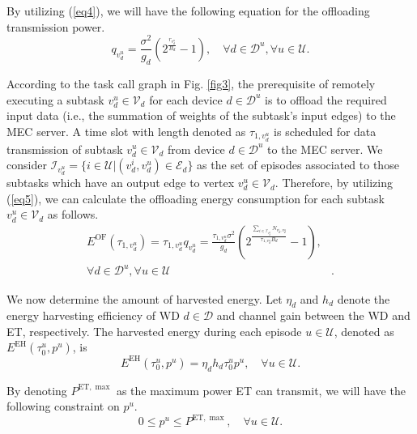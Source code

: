 \documentclass[12pt,draftclsnofoot,onecolumn]{IEEEtran}
\begin{document}
By utilizing (\ref{eq4}), we will have the following equation for the offloading transmission power.
\begin{equation}\label{eq5}
	q_{v_d^u} = \frac{\sigma^2}{g_d}\left(2^{\frac{r_{v_d^u}}{B_d}}-1\right),\quad\forall d\in\mathcal{D}^u, \forall u\in\mathcal{U}.
\end{equation}

According to the task call graph in Fig. \ref{fig3}, the prerequisite of remotely executing a subtask $v_d^u\in\mathcal{V}_d$ for each device $d\in\mathcal{D}^u$ is to offload the required input data (i.e., the summation of weights of the subtask's input edges) to the MEC server. A time slot with length denoted as $\tau_{1,v_d^u}$ is scheduled for data transmission of subtask $v_d^u\in\mathcal{V}_d$ from device $d\in\mathcal{D}^u$ to the MEC server. We consider $\mathcal{I}_{v_d^u}=\{i\in\mathcal{U}|(v_d^i,v_d^u)\in\mathcal{E}_d\}$ as the set of episodes associated to those subtasks which have an output edge to vertex $v_d^u\in\mathcal{V}_d$. Therefore, by utilizing (\ref{eq5}), we can calculate the offloading energy consumption for each subtask $v_d^u\in\mathcal{V}_d$ as follows.
\begin{equation}\label{eq6}
	\begin{aligned}
		E^{\text{OF}}(\tau_{1,v_d^u}) = \tau_{1,v_d^u}q_{v_d^u} = \frac{\tau_{1,v_d^u}\sigma^2}{g_d}\left(2^{\frac{\sum_{i\in\mathcal{I}_{v_d^u}}{N_{v_d^i,v_d^u}}}{\tau_{1,v_d^u}B_d}}-1\right),&\\
		\forall d\in\mathcal{D}^u, \forall u\in\mathcal{U} &.
	\end{aligned}
\end{equation}

We now determine the amount of harvested energy. Let $\eta_d$ and $h_d$ denote the energy harvesting efficiency of WD $d\in\mathcal{D}$ and channel gain between the WD and ET, respectively. The harvested energy during each episode $u\in\mathcal{U}$, denoted as $E^{\text{EH}}(\tau_0^u,p^u)$, is
\begin{equation}\label{eq7}
	E^{\text{EH}}(\tau_0^u,p^u) = \eta_dh_d\tau_0^up^u,\quad\forall u\in\mathcal{U}.
\end{equation}

By denoting $P^{\text{ET}, \max}$ as the maximum power ET can transmit, we will have the following constraint on $p^u$.
\begin{equation}\label{eq7_1}
	0\leq p^u\leq P^{\text{ET}, \max},\quad\forall u\in\mathcal{U}.
\end{equation}
\end{document}
